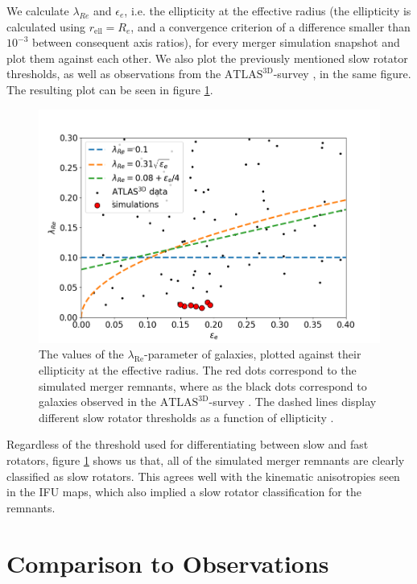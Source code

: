 \documentclass[english, oneside]{HYgradu}
\begin{document}
We calculate $\lambda_{Re}$ and $\epsilon_e$, i.e. the ellipticity at the effective radius (the ellipticity is calculated using $r_\mathrm{ell} = R_e$, and a convergence criterion of a difference smaller than $10^{-3}$ between consequent axis ratios), for every merger simulation snapshot and plot them against each other. We also plot the previously mentioned slow rotator thresholds, as well as observations from the $\mathrm{ATLAS^{3D}}$-survey \citep{Cappellari2011}, in the same figure. The resulting plot can be seen in figure \ref{figure:lambda_epsilon}. 

\begin{figure}[h]
	\centering
	\includegraphics[width=\textwidth]{lambda_epsilon.png}
	\caption{The values of the $\lambda_{\mathrm{Re}}$-parameter of galaxies, plotted against their ellipticity at the effective radius. The red dots correspond to the simulated merger remnants, where as the black dots correspond to galaxies observed in the $\mathrm{ATLAS^{3D}}$-survey \citep{Cappellari2011, Emsellem2011}. The dashed lines display different slow rotator thresholds as a function of ellipticity \citep{Emsellem2007, Emsellem2011, Cappellari2016}.}
	\label{figure:lambda_epsilon}
\end{figure}

Regardless of the threshold used for differentiating between slow and fast rotators, figure \ref{figure:lambda_epsilon} shows us that, all of the simulated merger remnants are clearly classified as slow rotators. This agrees well with the kinematic anisotropies seen in the IFU maps, which also implied a slow rotator classification for the remnants.

\section{Comparison to Observations}
\end{document}
